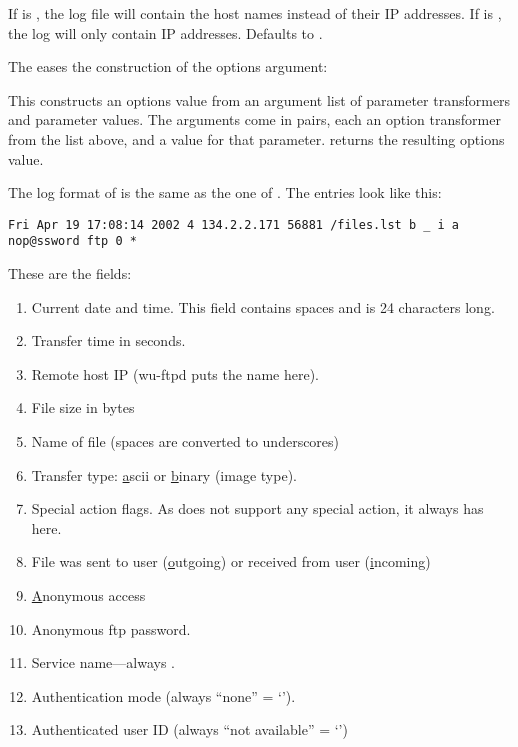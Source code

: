 \begin{desc}
  If  is \sharpt, the log file will contain the host
  names instead of their IP addresses.  If  is \sharpf,
  the log will only contain IP addresses.  Defaults to \sharpf.
\end{desc}
%
The  eases the construction of the options
argument:
%
\begin{desc}
  This constructs an options value from an argument list of parameter
  transformers and parameter values.  The arguments come in pairs,
  each an option transformer from the list above, and a value for that
  parameter.   returns the resulting options value.
\end{desc}

The log format of  is the same as the one of
.   The entries look like this:
%
\begin{verbatim}
Fri Apr 19 17:08:14 2002 4 134.2.2.171 56881 /files.lst b _ i a nop@ssword ftp 0 *
\end{verbatim}
%
These are the fields:
\begin{enumerate} 
\item Current date and time. This field contains
  spaces and is 24 characters long.
\item Transfer time in seconds.
\item Remote host IP (wu-ftpd puts the name here).
\item File size in bytes
\item Name of file (spaces are converted to underscores)
\item Transfer type: \underline{a}scii or \underline{b}inary (image type).
\item Special action flags. As  does not support any special
action, it always has \ex{\_} here.
\item File was sent to user (\underline{o}utgoing) or received from user
(\underline{i}ncoming) 
\item \underline{A}nonymous access
\item Anonymous ftp password.
\item Service name---always .
\item Authentication mode (always ``none'' = `').
\item Authenticated user ID (always ``not available'' = `\ex{*}')
\end{enumerate}

